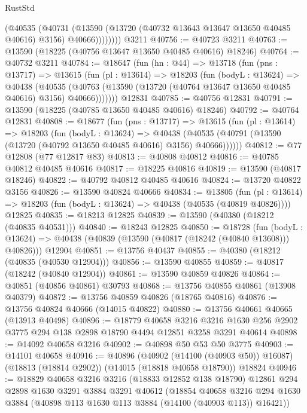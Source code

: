 \begin{lexlean}{RustStd}
\begin{coremodule}
              (@40535
                (@40731
                  (@13590 (@13720 (@40732 @13643 @13647 @13650 @40485 @40616) @3156) @40666))))))))
    @3211
@40756 := @40723 @3211
@40763 := @13590 (@18225 (@40756 @13647 @13650 @40485 @40616) @18246)
@40764 := @40732 @3211
@40784 := @18647
    (fun (hn : @44) =>
    @13718
      (fun (pns : @13717) =>
      @13615
        (fun (pl : @13614) =>
        @18203
          (fun (bodyL : @13624) =>
          @40438
            (@40535
              (@40763 (@13590 (@13720 (@40764 @13647 @13650 @40485 @40616) @3156) @40666)))))))
    @12831
@40785 := @40756 @12831
@40791 := @13590 (@18225 (@40785 @13650 @40485 @40616) @18246)
@40792 := @40764 @12831
@40808 := @18677
    (fun (pns : @13717) =>
    @13615
      (fun (pl : @13614) =>
      @18203
        (fun (bodyL : @13624) =>
        @40438 (@40535 (@40791 (@13590 (@13720 (@40792 @13650 @40485 @40616) @3156) @40666))))))
@40812 := @77 @12808 (@77 @12817 @83)
@40813 := @40808 @40812
@40816 := @40785 @40812 @40485 @40616
@40817 := @18225 @40816
@40819 := @13590 (@40817 @18246)
@40822 := @40792 @40812 @40485 @40616
@40824 := @13720 @40822 @3156
@40826 := @13590 @40824 @40666
@40834 := @13805
    (fun (pl : @13614) => @18203 (fun (bodyL : @13624) => @40438 (@40535 (@40819 @40826))))
    @12825
@40835 := @18213 @12825
@40839 := @13590 (@40380 (@18212 (@40835 @40531)))
@40840 := @18243 @12825
@40850 := @18728
    (fun (bodyL : @13624) => @40438 (@40839 (@13590 (@40817 (@18242 (@40840 @13608))) @40826)))
    @12904
@40851 := @13756 @40437
@40855 := @40380 (@18212 (@40835 (@40530 @12904)))
@40856 := @13590 @40855
@40859 := @40817 (@18242 (@40840 @12904))
@40861 := @13590 @40859 @40826
@40864 := @40851 (@40856 @40861) @30793
@40868 := @13756 @40855 @40861 (@13908 @40379)
@40872 := @13756 @40859 @40826 (@18765 @40816)
@40876 := @13756 @40824 @40666 (@14015 @40822)
@40880 := @13756 @40661 @40665 (@13913 @40498)
@40896 := @18779
    @40658
    @3216
    @3216
    @1630
    @256
    @2902
    @3775
    @294
    @138
    @2898
    @18790
    @4494
    @12851
    @3258
    @3291
    @40614
@40898 := @14092 @40658 @3216
@40902 := @40898 @50 @53 @50 @3775
@40903 := @14101 @40658
@40916 := @40896
    (@40902 (@14100 (@40903 @50)) @16087)
    (@18813 (@18814 @2902))
    (@14015 (@18818 @40658 @18790))
    @18824
@40946 := @18829
    @40658
    @3216
    @3216
    (@18833 @12852 @138 @18790)
    @12861
    @294
    @2898
    @1630
    @3291
    @3884
    @3291
    @40612
    (@18854
      @40658
      @3216
      @294
      @1630
      @3884
      (@40898 @113 @1630 @113 @3884 (@14100 (@40903 @113)) @16421))

\end{coremodule}
\end{lexlean}
